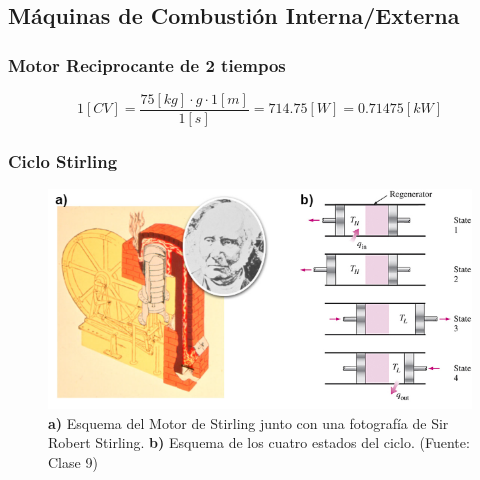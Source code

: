     \subsection{Máquinas de Combustión Interna/Externa}
    
        \subsubsection{Motor Reciprocante de 2 tiempos}
        
        \begin{quote}
            \textit{}
        \end{quote}
        
        
            \[1 [CV] = \frac{75 [kg] \cdot g \cdot 1 [m]}{1 [s]} = 714.75 [W] = 0.71475 [kW]\]
        
         \subsubsection{Ciclo Stirling}
         
            
            \begin{figure}
                \includegraphics[width=\textwidth]{img/clases/stirling.png}
                \caption[Motor de Stirling]{\textbf{a)} Esquema del Motor de Stirling junto con una fotografía de Sir Robert Stirling. \textbf{b)} Esquema de los cuatro estados del ciclo. (Fuente: Clase 9)}
                \label{fig:stirling}
            \end{figure}
            
